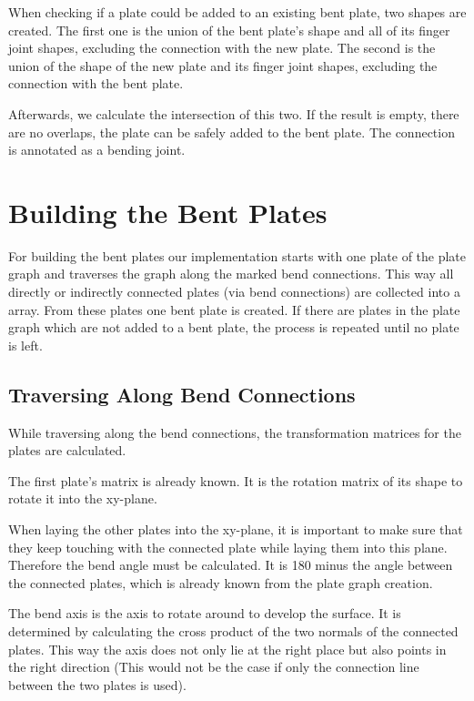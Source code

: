 \documentclass[../ClassicThesis.tex]{subfiles}
\begin{document}
When checking if a plate could be added to an existing bent plate, two shapes are created. The first one is the union of the bent plate's shape and all of its finger joint shapes, excluding the connection with the new plate. The second is the union of the shape of the new plate and its finger joint shapes, excluding the connection with the bent plate.

Afterwards, we calculate the intersection of this two. If the result is empty, there are no overlaps, the plate can be safely added to the bent plate. The connection is annotated as a bending joint.


\section{Building the Bent Plates}
For building the bent plates our implementation starts with one plate of the plate graph and traverses the graph along the marked bend connections. This way all directly or indirectly connected plates (via bend connections) are collected into a array. From these plates one bent plate is created. If there are plates in the plate graph which are not added to a bent plate, the process is repeated until no plate is left.

\subsection{Traversing Along Bend Connections}
\label{sec:traverse-along-bend-connection}

While traversing along the bend connections, the transformation matrices for the plates are calculated.

The first plate's matrix is already known. It is the rotation matrix of its shape to rotate it into the xy-plane.

When laying the other plates into the xy-plane, it is important to make sure that they keep touching with the connected plate while laying them into this plane. Therefore the bend angle must be calculated. It is 180\textdegree{} minus the angle between the connected plates, which is already known from the plate graph creation.

The bend axis is the axis  to rotate around to develop the surface. It is determined by calculating the cross product of the two normals of the connected plates. This way the axis does not only lie at the right place but also points in the right direction (This would not be the case if only the connection line between the two plates is used).
\end{document}
